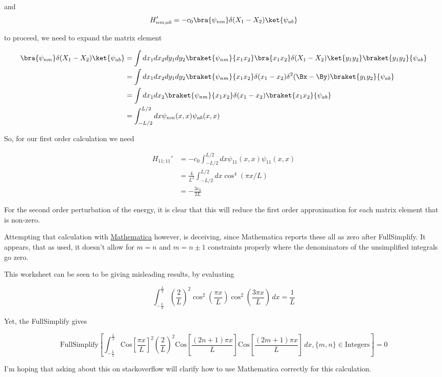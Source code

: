and
\begin{equation}\label{eqn:qmTwoPs4:410}
H_{nm;ab}' = -c_0 \bra{\psi_{nm}} \delta(X_1 - X_2) \ket{\psi_{ab}}
\end{equation}

to proceed, we need to expand the matrix element

\begin{align*}
\bra{\psi_{nm}} \delta(X_1 - X_2) \ket{\psi_{ab}}
&=
\int dx_1 dx_2 dy_1 dy_2
\braket{\psi_{nm}}{x_1 x_2} \bra{x_1 x_2} \delta(X_1 - X_2) \ket{y_1 y_2 } \braket{y_1 y_2}{\psi_{ab}} \\
&=
\int dx_1 dx_2 dy_1 dy_2
\braket{\psi_{nm}}{x_1 x_2} \delta(x_1 - x_2) \delta^2(\Bx - \By) \braket{y_1 y_2}{\psi_{ab}} \\
&=
\int dx_1 dx_2 
\braket{\psi_{nm}}{x_1 x_2} \delta(x_1 - x_2) \braket{x_1 x_2}{\psi_{ab}} \\
&=
\int_{-L/2}^{L/2} dx
\psi_{nm}(x, x)
\psi_{ab}(x, x)
\end{align*}

So, for our first order calculation we need 

\begin{align*}
H_{11; 11}' 
&= 
- c_0
\int_{-L/2}^{L/2} dx
\psi_{11}(x, x)
\psi_{11}(x, x) \\
&=
\frac{4}{L^2}
\int_{-L/2}^{L/2} dx
\cos^4( \pi x /L ) \\
&=
- \frac{3 c_0}{2 L}
\end{align*}

For the second order perturbation of the energy, it is clear that this will reduce the first order approximation for each matrix element that is non-zero.

Attempting that calculation with \href{https://github.com/peeterjoot/physicsplay/blob/796c8e3739ae1a9ca26270a0e91384afba45661d/notes/phy456/problem\%20set\%204,\%20problem\%202.nb}{Mathematica} however, is deceiving, since Mathematica reports these all as zero after FullSimplify.  It appears, that as used, it doesn't allow for $m = n$ and $m = n \pm 1$ constraints properly where the denominators of the unsimplified integrals go zero.

This worksheet can be seen to be giving misleading results, by evaluating

\begin{equation}\label{eqn:qmTwoPs4:430}
\int_{-\frac{L}{2}}^{\frac{L}{2}} \left(\frac{2}{L}\right)^2 \cos ^2\left(\frac{\pi  x}{L}\right) \cos ^2\left(\frac{3 \pi  x}{L}\right) \, dx = \frac{1}{L}
\end{equation}

Yet, the FullSimplify gives

\begin{equation}\label{eqn:qmTwoPs4:450}
\text{FullSimplify}\left[\int_{-\frac{L}{2}}^{\frac{L}{2}} \text{Cos}\left[\frac{\pi  x}{L}\right]^2 \left(\frac{2}{L}\right)^2 \text{Cos}\left[\frac{(2 n+1) \pi  x}{L}\right] \text{Cos}\left[\frac{(2 m+1) \pi  x}{L}\right] \, dx,\{m,n\}\in \text{Integers}\right] = 0
\end{equation}

I'm hoping that asking about this on stackoverflow will clarify how to use Mathematica correctly for this calculation.

\EndNoBibArticle
